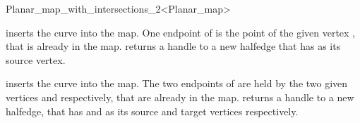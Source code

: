 \begin{ccRefClass}{Planar_map_with_intersections_2<Planar_map>}
\begin{ccAdvanced}
  {inserts the curve  into the map. One endpoint of 
  is the point of the given vertex , that is already in the
  map.  returns a handle to a
  new halfedge that has  as its source vertex.
  }
  
  {inserts the curve  into the map. The two endpoints of
   are held by the two given vertices  and 
  respectively, that are already in the
  map.  returns a handle to
  a new halfedge, that has  and  as its source and
  target vertices respectively.
  }

\end{ccAdvanced}


%
%
%
%


\end{ccRefClass}


\ccRefPageEnd
